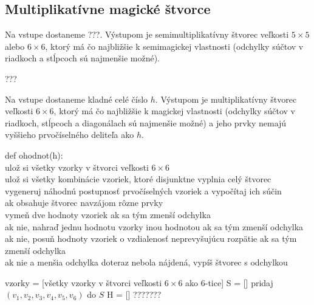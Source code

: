 \subsection{Multiplikatívne magické štvorce} 

\begin{subalg} Na vstupe dostaneme ???. Výstupom je semimultiplikatívny štvorec veľkosti $5 \times 5$ alebo $6 \times 6$, ktorý má čo najbližšie k semimagickej vlastnosti (odchylky súčtov v riadkoch a stĺpcoch sú najmenšie možné).
\end{subalg}

\begin{subcode}
???
\end{subcode}

\begin{subalg} Na vstupe dostaneme kladné celé číslo $h$. Výstupom je multiplikatívny štvorec veľkosti $6 \times 6$, ktorý má čo najbližšie k magickej vlastnosti (odchylky súčtov v riadkoch, stĺpcoch a diagonálach sú najmenšie možné) a jeho prvky nemajú vyššieho prvočíselného deliteľa ako $h$.
\end{subalg}

\begin{subcode}
def ohodnot(h): \\
ulož si všetky vzorky v štvorci veľkosti $6 \times 6$ \\
ulož si všetky kombinácie vzoriek, ktoré disjunktne vyplnia celý štvorec \\
vygeneruj náhodnú postupnosť prvočíselných vzoriek a vypočítaj ich súčin \\
ak obsahuje štvorec navzájom rôzne prvky \\
vymeň dve hodnoty vzoriek ak sa tým zmenší odchylka \\
ak nie, nahraď jednu hodnotu vzorky inou hodnotou ak sa tým zmenší odchylka \\
ak nie, posuň hodnoty vzoriek o vzdialenosť neprevyšujúcu rozpätie ak sa tým zmenší odchylka \\
ak nie a menšia odchylka doteraz nebola nájdená, vypíš štvorec s odchylkou
\end{subcode}

\begin{algorithmic}
\STATE vzorky = [všetky vzorky v štvorci veľkosti $6 \times 6$ ako 6-tice]
\STATE S = []
	\STATE pridaj $(v_1,v_2,v_3,v_4,v_5,v_6)$ do $S$
    \ENDIF
\ENDFOR
\STATE H = []
\STATE ???????
\end{algorithmic}

